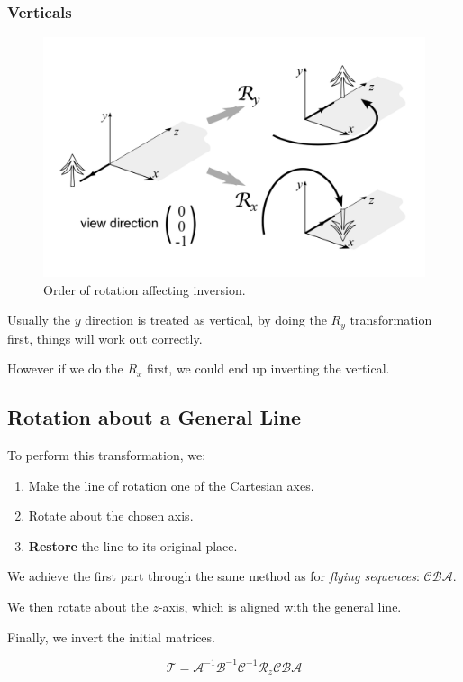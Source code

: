 \documentclass[11pt]{article}
\begin{document}
\subsubsection{Verticals}
\begin{figure}[h]
  \caption{Order of rotation affecting inversion.}
  \includegraphics[scale=0.2]{invert}
  \centering
\end{figure}

Usually the $y$ direction is treated as vertical, by doing the $R_y$ transformation first, things will work out correctly.

However if we do the $R_x$ first, we could end up inverting the vertical.

\subsection{Rotation about a General Line}
To perform this transformation, we:
\begin{enumerate}
  \item Make the line of rotation one of the Cartesian axes.
  \item Rotate about the chosen axis.
  \item \textbf{Restore} the line to its original place.
\end{enumerate}

We achieve the first part through the same method as for \textit{flying sequences}: $\mathcal{CBA}$.

We then rotate about the $z$-axis, which is aligned with the general line.

Finally, we invert the initial matrices.

\[
  \mathcal{T} = \mathcal{A}^{-1} \mathcal{B}^{-1} \mathcal{C}^{-1} \mathcal{R}_z \mathcal{CBA}  
\]
\end{document}
